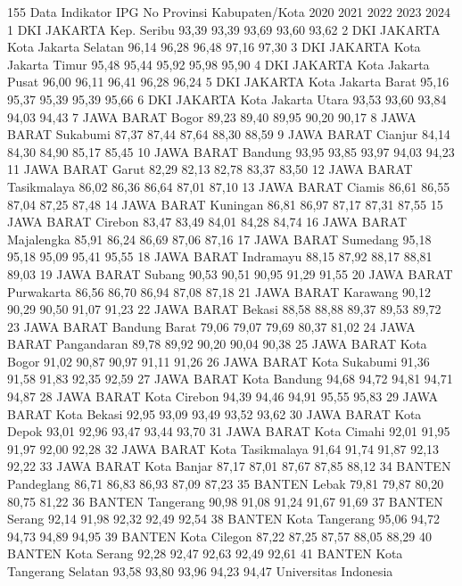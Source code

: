 155
Data Indikator IPG
No Provinsi Kabupaten/Kota 2020 2021 2022 2023 2024
1 DKI JAKARTA Kep. Seribu 93,39 93,39 93,69 93,60 93,62
2 DKI JAKARTA Kota Jakarta Selatan 96,14 96,28 96,48 97,16 97,30
3 DKI JAKARTA Kota Jakarta Timur 95,48 95,44 95,92 95,98 95,90
4 DKI JAKARTA Kota Jakarta Pusat 96,00 96,11 96,41 96,28 96,24
5 DKI JAKARTA Kota Jakarta Barat 95,16 95,37 95,39 95,39 95,66
6 DKI JAKARTA Kota Jakarta Utara 93,53 93,60 93,84 94,03 94,43
7 JAWA BARAT Bogor 89,23 89,40 89,95 90,20 90,17
8 JAWA BARAT Sukabumi 87,37 87,44 87,64 88,30 88,59
9 JAWA BARAT Cianjur 84,14 84,30 84,90 85,17 85,45
10 JAWA BARAT Bandung 93,95 93,85 93,97 94,03 94,23
11 JAWA BARAT Garut 82,29 82,13 82,78 83,37 83,50
12 JAWA BARAT Tasikmalaya 86,02 86,36 86,64 87,01 87,10
13 JAWA BARAT Ciamis 86,61 86,55 87,04 87,25 87,48
14 JAWA BARAT Kuningan 86,81 86,97 87,17 87,31 87,55
15 JAWA BARAT Cirebon 83,47 83,49 84,01 84,28 84,74
16 JAWA BARAT Majalengka 85,91 86,24 86,69 87,06 87,16
17 JAWA BARAT Sumedang 95,18 95,18 95,09 95,41 95,55
18 JAWA BARAT Indramayu 88,15 87,92 88,17 88,81 89,03
19 JAWA BARAT Subang 90,53 90,51 90,95 91,29 91,55
20 JAWA BARAT Purwakarta 86,56 86,70 86,94 87,08 87,18
21 JAWA BARAT Karawang 90,12 90,29 90,50 91,07 91,23
22 JAWA BARAT Bekasi 88,58 88,88 89,37 89,53 89,72
23 JAWA BARAT Bandung Barat 79,06 79,07 79,69 80,37 81,02
24 JAWA BARAT Pangandaran 89,78 89,92 90,20 90,04 90,38
25 JAWA BARAT Kota Bogor 91,02 90,87 90,97 91,11 91,26
26 JAWA BARAT Kota Sukabumi 91,36 91,58 91,83 92,35 92,59
27 JAWA BARAT Kota Bandung 94,68 94,72 94,81 94,71 94,87
28 JAWA BARAT Kota Cirebon 94,39 94,46 94,91 95,55 95,83
29 JAWA BARAT Kota Bekasi 92,95 93,09 93,49 93,52 93,62
30 JAWA BARAT Kota Depok 93,01 92,96 93,47 93,44 93,70
31 JAWA BARAT Kota Cimahi 92,01 91,95 91,97 92,00 92,28
32 JAWA BARAT Kota Tasikmalaya 91,64 91,74 91,87 92,13 92,22
33 JAWA BARAT Kota Banjar 87,17 87,01 87,67 87,85 88,12
34 BANTEN Pandeglang 86,71 86,83 86,93 87,09 87,23
35 BANTEN Lebak 79,81 79,87 80,20 80,75 81,22
36 BANTEN Tangerang 90,98 91,08 91,24 91,67 91,69
37 BANTEN Serang 92,14 91,98 92,32 92,49 92,54
38 BANTEN Kota Tangerang 95,06 94,72 94,73 94,89 94,95
39 BANTEN Kota Cilegon 87,22 87,25 87,57 88,05 88,29
40 BANTEN Kota Serang 92,28 92,47 92,63 92,49 92,61
41 BANTEN Kota Tangerang Selatan 93,58 93,80 93,96 94,23 94,47
Universitas Indonesia

